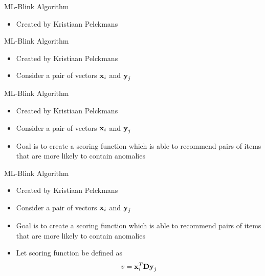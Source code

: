 \begin{frame}{ML-Blink Algorithm}
    \begin{itemize}
        \item Created by Kristiaan Pelckmans
    \end{itemize}
\end{frame}

\begin{frame}{ML-Blink Algorithm}
    \begin{itemize}
        \item Created by Kristiaan Pelckmans
        \item Consider a pair of vectors $\boldsymbol{\mathbf{x}}_i$ and $\boldsymbol{\mathbf{y}}_j$
    \end{itemize}
\end{frame}

\begin{frame}{ML-Blink Algorithm}
    \begin{itemize}
        \item Created by Kristiaan Pelckmans
        \item Consider a pair of vectors $\boldsymbol{\mathbf{x}}_i$ and $\boldsymbol{\mathbf{y}}_j$
        \item Goal is to create a scoring function which is able to recommend pairs of items that are more likely to contain anomalies
    \end{itemize}
\end{frame}

\begin{frame}{ML-Blink Algorithm}
    \begin{itemize}
        \item Created by Kristiaan Pelckmans
        \item Consider a pair of vectors $\boldsymbol{\mathbf{x}}_i$ and $\boldsymbol{\mathbf{y}}_j$
        \item Goal is to create a scoring function which is able to recommend pairs of items that are more likely to contain anomalies
        \item Let scoring function be defined as 
            \begin{equation} \label{eq:v-explicit}
                v = \boldsymbol{\mathbf{x}}_{i}^{T} \boldsymbol{\mathbf{D}} \boldsymbol{\mathbf{y}}_j  
            \end{equation}
    \end{itemize}
\end{frame}


